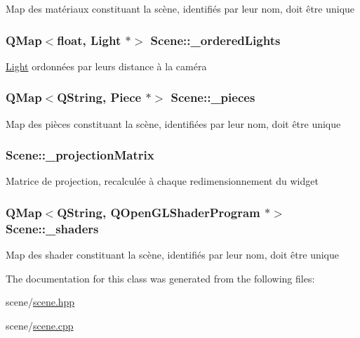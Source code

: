 Map des matériaux constituant la scène, identifiés par leur nom, doit être unique \hypertarget{class_scene_a5fae715ba6bdde7c382f9d779095a718}{
\subsubsection[{\+\_\+ordered\+Lights}]{\setlength{\rightskip}{0pt plus 5cm}Q\+Map$<$float, {\bf Light} $\ast$$>$ Scene\+::\+\_\+ordered\+Lights\hspace{0.3cm}{\ttfamily [private]}}}\label{class_scene_a5fae715ba6bdde7c382f9d779095a718}
\hyperlink{class_light}{Light} ordonnées par leurs distance à la caméra \hypertarget{class_scene_aa3a488d4be41fe6a187488e1e7a1035c}{
\subsubsection[{\+\_\+pieces}]{\setlength{\rightskip}{0pt plus 5cm}Q\+Map$<$Q\+String, {\bf Piece} $\ast$$>$ Scene\+::\+\_\+pieces\hspace{0.3cm}{\ttfamily [private]}}}\label{class_scene_aa3a488d4be41fe6a187488e1e7a1035c}
Map des pièces constituant la scène, identifiées par leur nom, doit être unique \hypertarget{class_scene_a7db3394191c0a07e6bdc456a53ac8ece}{
\subsubsection[{\+\_\+projection\+Matrix}]{ Scene\+::\+\_\+projection\+Matrix\hspace{0.3cm}{\ttfamily [private]}}}\label{class_scene_a7db3394191c0a07e6bdc456a53ac8ece}
Matrice de projection, recalculée à chaque redimensionnement du widget \hypertarget{class_scene_abde34dc03c8d3a07b3177041ab195f07}{
\subsubsection[{\+\_\+shaders}]{\setlength{\rightskip}{0pt plus 5cm}Q\+Map$<$Q\+String, Q\+Open\+G\+L\+Shader\+Program $\ast$$>$ Scene\+::\+\_\+shaders\hspace{0.3cm}{\ttfamily [private]}}}\label{class_scene_abde34dc03c8d3a07b3177041ab195f07}
Map des shader constituant la scène, identifiés par leur nom, doit être unique 

The documentation for this class was generated from the following files\+:\begin{DoxyCompactItemize}
\item 
scene/\hyperlink{scene_8hpp}{scene.\+hpp}\item 
scene/\hyperlink{scene_8cpp}{scene.\+cpp}\end{DoxyCompactItemize}

